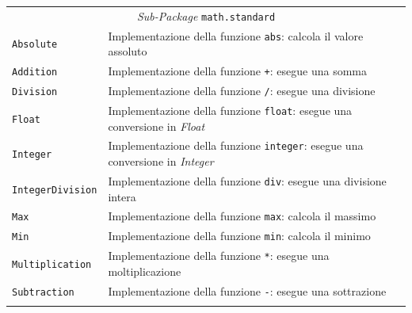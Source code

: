 \begin{longtable}{p{3.5cm}p{8.5cm}}
\multicolumn{2}{c}{\emph{Sub-Package} \texttt{math.standard}}\\
	\hdashline[5pt/5pt]
		\texttt{Absolute} & Implementazione della funzione \texttt{abs}: calcola il valore assoluto \\ 
	\hdashline[1pt/5pt]
		\texttt{Addition} & Implementazione della funzione \texttt{+}: esegue una somma\\ 
	\hdashline[1pt/5pt]
		\texttt{Division} & Implementazione della funzione \texttt{/}: esegue una divisione\\ 
	\hdashline[1pt/5pt]
		\texttt{Float} & Implementazione della funzione \texttt{float}: esegue una conversione in \emph{Float}\\ 
	\hdashline[1pt/5pt]
		\texttt{Integer} & Implementazione della funzione \texttt{integer}: esegue una conversione in \emph{Integer}\\ 
	\hdashline[1pt/5pt]
		\texttt{IntegerDivision} & Implementazione della funzione \texttt{div}: esegue una divisione intera\\ 
	\hdashline[1pt/5pt]
		\texttt{Max} & Implementazione della funzione \texttt{max}: calcola il massimo\\
	\hdashline[1pt/5pt]
		\texttt{Min} & Implementazione della funzione \texttt{min}: calcola il minimo\\
	\hdashline[1pt/5pt]
		\texttt{Multiplication} & Implementazione della funzione \texttt{*}: esegue una moltiplicazione\\
	\hdashline[1pt/5pt]
		\texttt{Subtraction} & Implementazione della funzione \texttt{-}: esegue una sottrazione\\
	\hline\\
	

\end{longtable}
